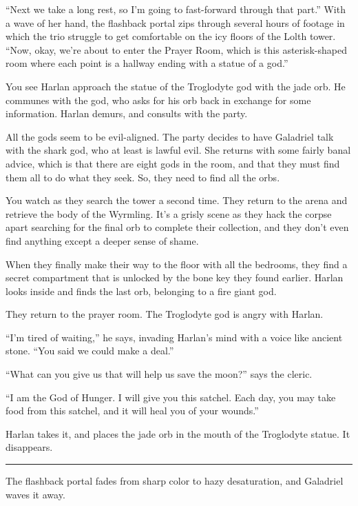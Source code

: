 \documentclass[smalldemyvopaper,11pt,twoside,onecolumn,openright,extrafontsizes]{memoir}
\begin{document}
``Next we take a long rest, so I'm going to fast-forward through that
part.'' With a wave of her hand, the flashback portal zips through
several hours of footage in which the trio struggle to get comfortable
on the icy floors of the Lolth tower. ``Now, okay, we're about to enter
the Prayer Room, which is this asterisk-shaped room where each point is
a hallway ending with a statue of a god.''

You see Harlan approach the statue of the Troglodyte god with the jade
orb. He communes with the god, who asks for his orb back in exchange for
some information. Harlan demurs, and consults with the party.

All the gods seem to be evil-aligned. The party decides to have
Galadriel talk with the shark god, who at least is lawful evil. She
returns with some fairly banal advice, which is that there are eight
gods in the room, and that they must find them all to do what they seek.
So, they need to find all the orbs.

You watch as they search the tower a second time. They return to the
arena and retrieve the body of the Wyrmling. It's a grisly scene as they
hack the corpse apart searching for the final orb to complete their
collection, and they don't even find anything except a deeper sense of
shame.

When they finally make their way to the floor with all the bedrooms,
they find a secret compartment that is unlocked by the bone key they
found earlier. Harlan looks inside and finds the last orb, belonging to
a fire giant god.

They return to the prayer room. The Troglodyte god is angry with Harlan.

``I'm tired of waiting,'' he says, invading Harlan's mind with a voice
like ancient stone. ``You said we could make a deal.''

``What can you give us that will help us save the moon?'' says the
cleric.

``I am the God of Hunger. I will give you this satchel. Each day, you
may take food from this satchel, and it will heal you of your wounds.''

Harlan takes it, and places the jade orb in the mouth of the Troglodyte
statue. It disappears.

\begin{center}\rule{0.5\linewidth}{\linethickness}\end{center}

The flashback portal fades from sharp color to hazy desaturation, and
Galadriel waves it away.
\end{document}
